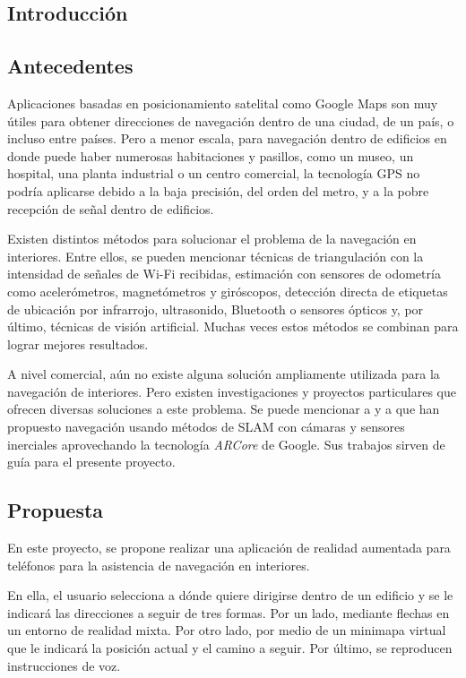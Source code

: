 \documentclass{article}
\newenvironment{standalone}{\begin{preview}}{\end{preview}}
\begin{document}
\begin{standalone}

  \section{Introducción}

  \subsection{Antecedentes}

  Aplicaciones basadas en posicionamiento satelital como Google Maps son muy útiles para obtener direcciones de navegación dentro de una ciudad, de un país, o incluso entre países.
  Pero a menor escala, para navegación dentro de edificios en donde puede haber numerosas habitaciones y pasillos, como un museo, un hospital, una planta industrial o un centro comercial, la tecnología GPS no podría aplicarse debido a la baja precisión, del orden del metro, y a la pobre recepción de señal dentro de edificios.

  Existen distintos métodos para solucionar el problema de la navegación en interiores.
  Entre ellos, se pueden mencionar técnicas de triangulación con la intensidad de señales de Wi-Fi recibidas, estimación con sensores de odometría como acelerómetros, magnetómetros y giróscopos, detección directa de etiquetas de ubicación por infrarrojo, ultrasonido, Bluetooth o sensores ópticos y, por último, técnicas de visión artificial.
  Muchas veces estos métodos se combinan para lograr mejores resultados.

  A nivel comercial, aún no existe alguna solución ampliamente utilizada para la navegación de interiores.
  Pero existen investigaciones y proyectos particulares que ofrecen diversas soluciones a este problema.
  Se puede mencionar a \citeauthor{slamNavARM} \cite{slamNavARM} y a \citeauthor{indoorNavRacoons} \cite{indoorNavRacoons} que han propuesto navegación usando métodos de SLAM con cámaras y sensores inerciales aprovechando la tecnología \textit{ARCore} de Google.
  Sus trabajos sirven de guía para el presente proyecto.

  \subsection{Propuesta}

  En este proyecto, se propone realizar una aplicación de realidad aumentada para teléfonos para la asistencia de navegación en interiores.

  En ella, el usuario selecciona a dónde quiere dirigirse dentro de un edificio y se le indicará las direcciones a seguir de tres formas.
  Por un lado, mediante flechas en un entorno de realidad mixta.
  Por otro lado, por medio de un minimapa virtual que le indicará la posición actual y el camino a seguir.
  Por último, se reproducen instrucciones de voz.

\end{standalone}
\end{document}
